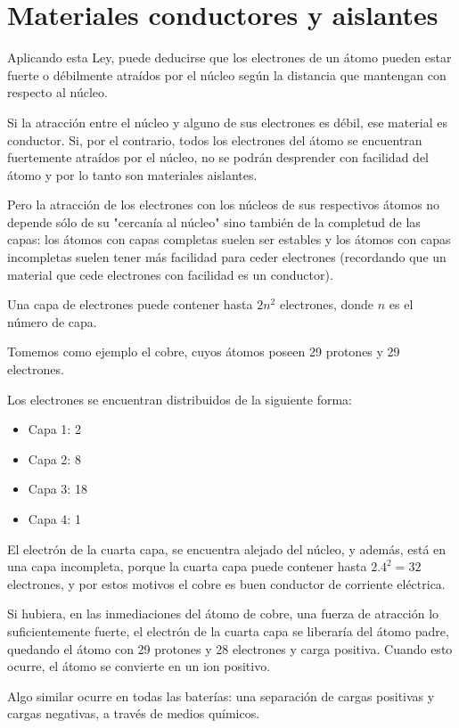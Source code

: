 \section{Materiales conductores y aislantes}

Aplicando esta Ley, puede deducirse que los electrones de un átomo pueden estar fuerte o débilmente atraídos por el núcleo según la distancia que mantengan con respecto al núcleo.

Si la atracción entre el núcleo y alguno de sus electrones es débil, ese material es conductor. Si, por el contrario, todos los electrones del átomo se encuentran fuertemente atraídos por el núcleo, no se podrán desprender con facilidad del átomo y por lo tanto son materiales aislantes.

Pero la atracción de los electrones con los núcleos de sus respectivos átomos no depende sólo de su "cercanía al núcleo" sino también de la completud de las capas: los átomos con capas completas suelen ser estables y los átomos con capas incompletas suelen tener más facilidad para ceder electrones (recordando que un material que cede electrones con facilidad es un conductor).

Una capa de electrones puede contener hasta $2n^{2}$ electrones, donde $n$ es el número de capa.

Tomemos como ejemplo el cobre, cuyos átomos poseen 29 protones y 29 electrones.

Los electrones se encuentran distribuidos de la siguiente forma:
\begin{itemize}
	\item Capa 1: 2
	\item Capa 2: 8
	\item Capa 3: 18
	\item Capa 4: 1
\end{itemize}

El electrón de la cuarta capa, se encuentra alejado del núcleo, y además, está en una capa incompleta, porque la cuarta capa puede contener hasta $2.4^{2}=32$ electrones, y por estos motivos el cobre es buen conductor de corriente eléctrica.

Si hubiera, en las inmediaciones del átomo de cobre, una fuerza de atracción lo suficientemente fuerte, el electrón de la cuarta capa se liberaría del átomo padre, quedando el átomo con 29 protones y 28 electrones y carga positiva. Cuando esto ocurre, el átomo se convierte en un ion positivo.

Algo similar ocurre en todas las baterías: una separación de cargas positivas y cargas negativas, a través de medios químicos.

